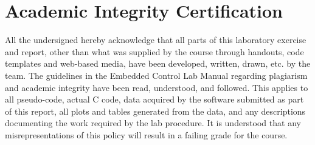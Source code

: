 \documentclass[12pt]{article}
\begin{document}
\section{Academic Integrity Certification}
All the undersigned hereby acknowledge that all parts of this laboratory exercise and report, other than what was supplied by the course through handouts, code templates and web-based media, have been developed, written, drawn, etc. by the team. The guidelines in the Embedded Control Lab Manual regarding plagiarism and academic integrity have been read, understood, and followed. This applies to all pseudo-code, actual C code, data acquired by the software submitted as part of this report, all plots and tables generated from the data, and any descriptions documenting the work required by the lab procedure. It is understood that any misrepresentations of this policy will result in a failing grade for the course.
\newpage
\end{document}

